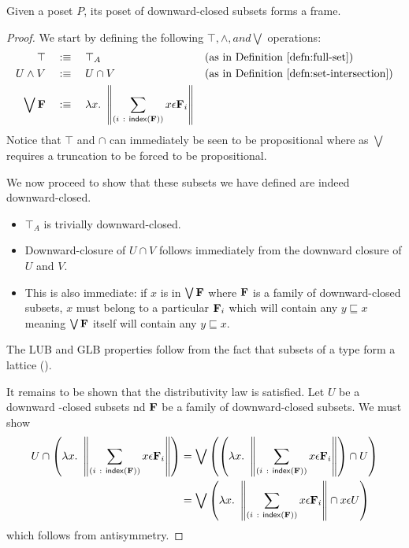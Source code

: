 \begin{thm}
  Given a poset $P$, its poset of downward-closed subsets forms a frame.
\end{thm}
\begin{proof}
  We start by defining the following $\top, \wedge, and \bigvee$ operations:
  \begin{align*}
    \top       \quad&:\equiv\quad \top_A   && \text{(as in Definition~\ref{defn:full-set})}               \\
    U \wedge V   \quad&:\equiv\quad U \cap V && \text{(as in Definition~\ref{defn:set-intersection})}       \\
    \bigvee \mathbf{F}{} \quad&:\equiv\quad \lambda x.~ \left\| \sum_{(i~:~\mathsf{index}{}\left(\mathbf{F}{}\right))} x \epsilon \mathbf{F}{}_i \right\|
  \end{align*}
  Notice that $\top$ and $\cap$ can immediately be seen to be propositional where as $\bigvee$
  requires a truncation to be forced to be propositional.

  We now proceed to show that these subsets we have defined are indeed downward-closed.
  \begin{itemize}
    \item $\top_A$ is trivially downward-closed.
    \item Downward-closure of $U \cap V$ follows immediately from the downward closure of $U$
      and $V$.
    \item This is also immediate: if $x$ is in $\bigvee \mathbf{F}{}$ where $\mathbf{F}{}$ is a family of
      downward-closed subsets, $x$ must belong to a particular $\mathbf{F}{}_i$ which will contain
      any $y \sqsubseteq x$ meaning $\bigvee \mathbf{F}{}$ itself will contain any $y \sqsubseteq x$.
  \end{itemize}
  The LUB and GLB properties follow from the fact that subsets of a type form a lattice
  ().

  It remains to be shown that the distributivity law is satisfied. Let $U$ be a downward
  -closed subsets nd $\mathbf{F}{}$ be a family of downward-closed subsets. We must show
  \begin{align*}
    U \cap \left(\lambda x.~ \left\| \sum_{(i~:~\mathsf{index}{}\left(\mathbf{F}{}\right))} x \epsilon \mathbf{F}{}_i \right\|\right) &=
      \bigvee \left( \left( \lambda x.~ \left\| \sum_{(i~:~\mathsf{index}{}\left(\mathbf{F}{}\right))} x \epsilon \mathbf{F}{}_i \right\|\right) \cap U \right)\\
      &= \bigvee \left( \lambda x.~ \left\| \sum_{(i~:~\mathsf{index}{}\left(\mathbf{F}{}\right))} x \epsilon \mathbf{F}{}_i \right\| \cap x \epsilon U \right)
  \end{align*}
  which follows from antisymmetry.
\end{proof}

